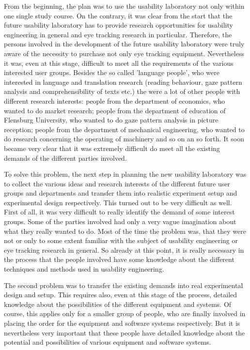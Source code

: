\begin{
}[h]
\begin{styleBodyTextIndent}
From the beginning, the plan was to use the usability laboratory not only within one single study course. On the contrary, it was clear from the start that the future usability laboratory has to provide research opportunities for usability engineering in general and eye tracking research in particular. Therefore, the persons involved in the development of the future usability laboratory were truly aware of the necessity to purchase not only eye tracking equipment. Nevertheless it was, even at this stage, difficult to meet all the requirements of the various interested user groups. Besides the so called 'language people', who were interested in language and translation research (reading behaviour, gaze pattern analysis and comprehensibility of texts etc.) the were a lot of other people with different research interests: people from the department of economics, who wanted to do market research; people from the department of education of Flensburg University, who wanted to do gaze pattern analysis in picture reception; people from the department of mechanical engineering, who wanted to do research concerning the operating of machinery and so on an so forth. It soon became very clear that it was extremely difficult do meet all the existing demands of the different parties involved.
\end{styleBodyTextIndent}

\begin{styleBodyTextIndent}
To solve this problem, the next step in planning the new usability laboratory was to collect the various ideas and research interests of the different future user groups and departments and transfer them into realistic experiment setup and experimental design respectively. This turned out to be very difficult as well. First of all, it was very difficult to really identify the demand of some interest groups. Some of the parties involved had only a very vague imagination about what they really wanted to do. Most of the time the problem was, that they were not or only to some extent familiar with the subject of usability engineering or eye tracking research in general. So already at this point, it is really necessary in the process that the people involved have some knowledge about the different techniques and methods used in usability engineering. 
\end{styleBodyTextIndent}

\begin{styleBodyTextIndent}
The second problem was to transfer the existing demands into real experimental design and setup. This requires also, even at this stage of the process, detailed knowledge about the possibilities of the different equipment and systems. Of course, this applies only for a smaller group of people, who are finally involved in placing the order for the equipment and software systems respectively. But it is nevertheless very important that these people have detailed knowledge about the potential and possibilities of various equipment and software systems. 
\end{styleBodyTextIndent}


\end{
}
